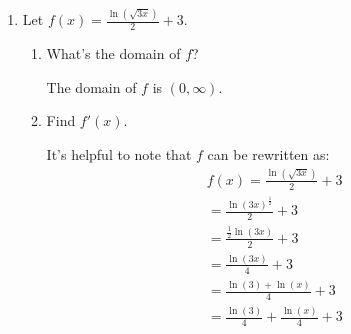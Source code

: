 \documentclass{article}
\begin{document}
\begin{enumerate}
\begin{enumerate}
\begin{solution}
      This is graph (5).
    \end{solution}

  \item
    \begin{problem}[\vfill\newpage]
      $j(x) = \log_3 (5x^2)$
    \end{problem}

    \begin{solution}
        $j(x) = \log_3 (5x^2) = \log_3(5) + \log_3(x^2) = \log_3(5)+2\log_3(x)$.

        This is graph (2).
    \end{solution}

  \end{enumerate}

\item  

  Let $\displaystyle f(x)=\frac{\ln \left(\sqrt{3x} \right)}{2}+3$.

  \begin{enumerate}
  \item

    \begin{problem}[0.5in]
      What's the domain of $f$?
    \end{problem}

    \begin{solution}
        The domain of $f$ is $(0, \infty)$. 
    \end{solution}

  \item
    \begin{problem}[1in]
      Find $f'(x)$.
    \end{problem}

        \begin{solution}
        It's helpful to note that $f$ can be rewritten as:
        \begin{align*}
            f(x)=\frac{\ln \left(\sqrt{3x} \right)}{2}+3 \\
            = \frac{\ln(3x)^{\frac{1}{2}}}{2} + 3 \\
             = \frac{\frac{1}{2}\ln(3x)}{2} + 3 \\
             = \frac{\ln(3x)}{4 } +3 \\
            = \frac{\ln(3)+\ln(x)}{4} + 3\\
            = \frac{\ln(3)}{4} + \frac{\ln(x)}{4} + 3\\
        \end{align*}


\end{solution}
\end{enumerate}
\end{enumerate}
\end{document}
